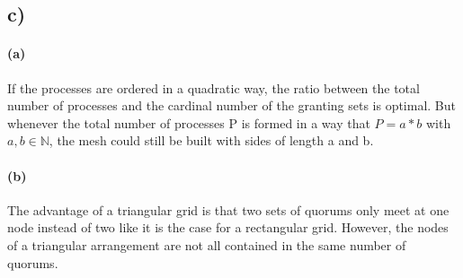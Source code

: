 \documentclass[12pt,a4paper]{article}
\begin{document}
  \subsection*{c)} %
    \paragraph*{(a)} 
    If the processes are ordered in a quadratic way, the ratio between the total number of processes and the cardinal number of the granting sets is optimal. But whenever the total number of processes P is formed in a way that $P=a*b$ with $a,b \in \mathbb{N}$, the mesh could still be built with sides of length a and b.
    \paragraph*{(b)} %
	The advantage of a triangular grid is that two sets of quorums only meet at one node instead of two like it is the case for a rectangular grid. However, the nodes of a triangular arrangement are not all contained in the same number of quorums.
\end{document}
